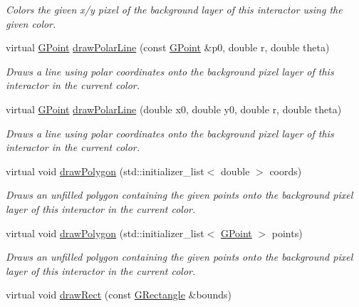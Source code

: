 \begin{DoxyCompactItemize}
\begin{DoxyCompactList}\small\item\em Colors the given x/y pixel of the background layer of this interactor using the given color. \end{DoxyCompactList}\item 
virtual \mbox{\hyperlink{classGPoint}{G\+Point}} \mbox{\hyperlink{classGDrawingSurface_af70cce1e4f708f1ed5b6f29cecb660e7}{draw\+Polar\+Line}} (const \mbox{\hyperlink{classGPoint}{G\+Point}} \&p0, double r, double theta)
\begin{DoxyCompactList}\small\item\em Draws a line using polar coordinates onto the background pixel layer of this interactor in the current color. \end{DoxyCompactList}\item 
virtual \mbox{\hyperlink{classGPoint}{G\+Point}} \mbox{\hyperlink{classGDrawingSurface_ad3e646f90005295f2bbdf37d2bcb39d2}{draw\+Polar\+Line}} (double x0, double y0, double r, double theta)
\begin{DoxyCompactList}\small\item\em Draws a line using polar coordinates onto the background pixel layer of this interactor in the current color. \end{DoxyCompactList}\item 
virtual void \mbox{\hyperlink{classGDrawingSurface_afddec0a905108d8a8d6809a157f26776}{draw\+Polygon}} (std\+::initializer\+\_\+list$<$ double $>$ coords)
\begin{DoxyCompactList}\small\item\em Draws an unfilled polygon containing the given points onto the background pixel layer of this interactor in the current color. \end{DoxyCompactList}\item 
virtual void \mbox{\hyperlink{classGDrawingSurface_a021ee881e0d154dc4dd059698742889c}{draw\+Polygon}} (std\+::initializer\+\_\+list$<$ \mbox{\hyperlink{classGPoint}{G\+Point}} $>$ points)
\begin{DoxyCompactList}\small\item\em Draws an unfilled polygon containing the given points onto the background pixel layer of this interactor in the current color. \end{DoxyCompactList}\item 
virtual void \mbox{\hyperlink{classGDrawingSurface_a3dd4cc5891149dfc36746264f7289877}{draw\+Rect}} (const \mbox{\hyperlink{classGRectangle}{G\+Rectangle}} \&bounds)

\end{DoxyCompactItemize}
